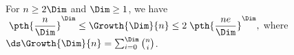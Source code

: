 \providecommand{\LemmaGrowthImproved}{%
       For $n \geq 2\Dim$ and $\Dim \geq 1$, we have
       \begin{math}
           \;\displaystyle \pth{\frac{n }{\Dim}}^\Dim%
           \leq%
           \Growth{\Dim}{n}%
           \leq%
           2\; \pth{\frac{n e}{\Dim}}^\Dim,
       \end{math}
        where $\ds\Growth{\Dim}{n} =
       \sum_{i=0}^{\Dim} \binom{n}{i}$.}
    \begin{lemma}
        \LemmaGrowthImproved        
    \end{lemma}
